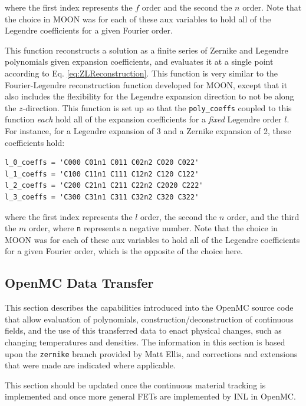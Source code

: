 \documentclass[10pt]{article}
\newcounter{subsubsubsection}[subsubsection]
\numberwithin{equation}{section} %
\begin{document}
where the first index represents the \(f\) order and the second the \(n\) order. Note that the choice in MOON was for each of these aux variables to hold all of the Legendre coefficients for a given Fourier order.

This function reconstructs a solution as a finite series of Zernike and Legendre polynomials given expansion coefficients, and evaluates it at a single point according to Eq. \eqref{eq:ZLReconstruction}. This function is very similar to the Fourier-Legendre reconstruction function developed for MOON, except that it also includes the flexibility for the Legendre expansion direction to not be along the \(z\)-direction. This function is set up so that the {\tt poly\_coeffs} coupled to this function {\it each} hold all of the expansion coefficients for a {\it fixed} Legendre order \(l\). For instance, for a Legendre expansion of 3 and a Zernike expansion of 2, these coefficients hold:

\begin{lstlisting}
l_0_coeffs = 'C000 C01n1 C011 C02n2 C020 C022'
l_1_coeffs = 'C100 C11n1 C111 C12n2 C120 C122'
l_2_coeffs = 'C200 C21n1 C211 C22n2 C2020 C222'
l_3_coeffs = 'C300 C31n1 C311 C32n2 C320 C322'
\end{lstlisting}

where the first index represents the \(l\) order, the second the \(n\) order, and the third the \(m\) order, where {\tt n} represents a negative number. Note that the choice in MOON was for each of these aux variables to hold all of the Legendre coefficients for a given Fourier order, which is the opposite of the choice here. 

\subsection{OpenMC Data Transfer}
\label{sec:OpenMCTransfer}
This section describes the capabilities introduced into the OpenMC source code that allow evaluation of polynomials, construction/deconstruction of continuous fields, and the use of this transferred data to enact physical changes, such as changing temperatures and densities. The information in this section is based upon the {\tt zernike} branch provided by Matt Ellis, and corrections and extensions that were made are indicated where applicable.

\color{magenta}
This section should be updated once the continuous material tracking is implemented and once more general FETs are implemented by INL in OpenMC.
\color{black}
\end{document}
